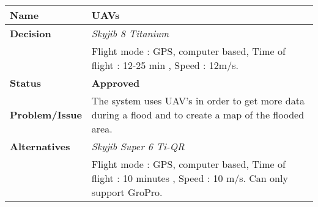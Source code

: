 \begin{table}[H]
	\begin{tabular}{L{0.2\textwidth} L{0.6\textwidth}}
						
		\textbf{Name}          & \textbf{UAVs}                                                                                                                                                              \\ \toprule
		\textbf{Decision}      & \textbf{}                                                                                                                                                             
								\textit{Skyjib 8 Titanium} \\ 
								& Flight mode : GPS, computer based, Time of flight :  12-25 min  , Speed : 12m/s. \\                                                                                         \midrule
		\textbf{Status}        & \textbf{Approved}                                                                                                                                                          \\ \midrule
		\textbf{Problem/Issue} & The system uses UAV's in order to get more data during a flood and to create a map of the flooded area.                                                                    \\ \midrule
		\textbf{Alternatives} 
		                       & \textit {Skyjib Super 6 Ti-QR}                                                                                                                                             \\
		                       & Flight mode : GPS, computer based, Time of flight : 10 minutes , Speed : 10 m/s. Can only support GroPro.                                                                
		                       

\end{tabular}
\end{table}
